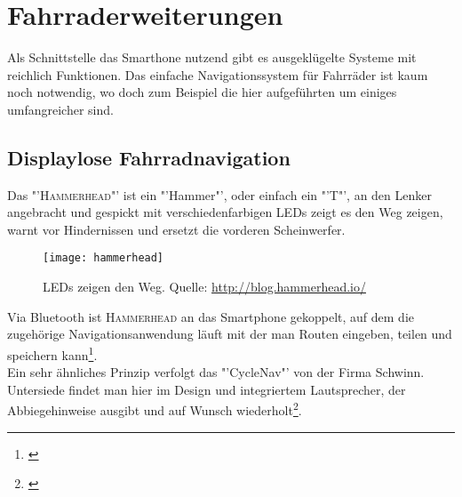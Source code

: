\section{Fahrraderweiterungen}
Als Schnittstelle das Smarthone nutzend gibt es ausgeklügelte Systeme mit reichlich Funktionen. Das einfache Navigationssystem für Fahrräder ist kaum noch notwendig, wo doch zum Beispiel die hier aufgeführten um einiges umfangreicher sind.
\subsection{Displaylose Fahrradnavigation}
Das "'\textsc{Hammerhead}"' ist ein "'Hammer"', oder einfach ein "'T"', an den Lenker angebracht und gespickt mit verschiedenfarbigen \gls{LED}s zeigt es den Weg zeigen, warnt vor Hindernissen und ersetzt die vorderen Scheinwerfer.
\begin{figure}[H]
    \centering
    \texttt{[image: hammerhead]}
    \caption[Hammerhead]{LEDs zeigen den Weg.  Quelle: \url{http://blog.hammerhead.io/}} \label{fig:hammerhead}
\end{figure}
Via Bluetooth ist \textsc{Hammerhead} an das Smartphone gekoppelt, auf dem die zugehörige Navigationsanwendung läuft mit der man Routen eingeben, teilen und speichern kann\footnote{\cite{Hammerhead}}.\\
 Ein sehr ähnliches Prinzip verfolgt das "'CycleNav"' von der Firma Schwinn. Untersiede findet man hier im Design und integriertem Lautsprecher, der Abbiegehinweise ausgibt und auf Wunsch wiederholt\footnote{\cite{CycleNav}}.

